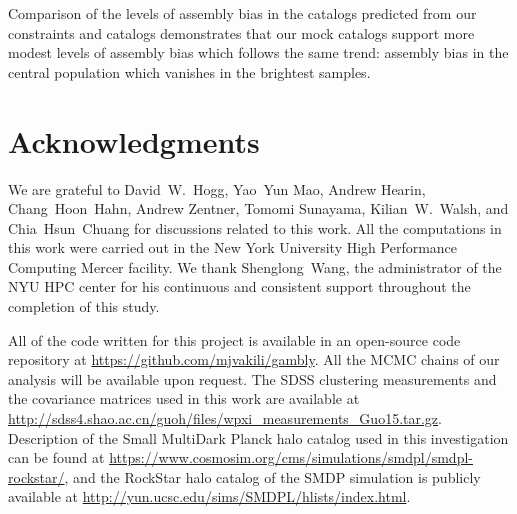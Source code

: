 Comparison of the levels of assembly bias in the catalogs predicted from our constraints and \citealt{hw2013} catalogs demonstrates that our mock catalogs support more modest levels of assembly bias which follows the same trend: assembly bias in the central population which vanishes in the brightest samples.

\section*{Acknowledgments}

We are grateful to David~W.~Hogg, Yao~Yun Mao, Andrew Hearin, Chang~Hoon~Hahn, Andrew Zentner, Tomomi Sunayama, Kilian~W.~Walsh, and Chia~Hsun~Chuang for
discussions related to this work. All the computations in this work were carried out in the New York University High Performance Computing Mercer facility. We thank Shenglong~Wang, the administrator of the NYU HPC center for his continuous and consistent support throughout the completion of this study. 

All of the code written for this project is available in an open-source
code repository at \url{https://github.com/mjvakili/gambly}. All the MCMC chains of our analysis will be available upon request.
The SDSS clustering measurements and the covariance matrices used in this work are available at \url{http://sdss4.shao.ac.cn/guoh/files/wpxi_measurements_Guo15.tar.gz}. Description of the Small MultiDark Planck halo catalog used in this investigation can be found at \url{https://www.cosmosim.org/cms/simulations/smdpl/smdpl-rockstar/}, and the RockStar halo catalog of the SMDP simulation is publicly available at \url{http://yun.ucsc.edu/sims/SMDPL/hlists/index.html}.

\clearpage


